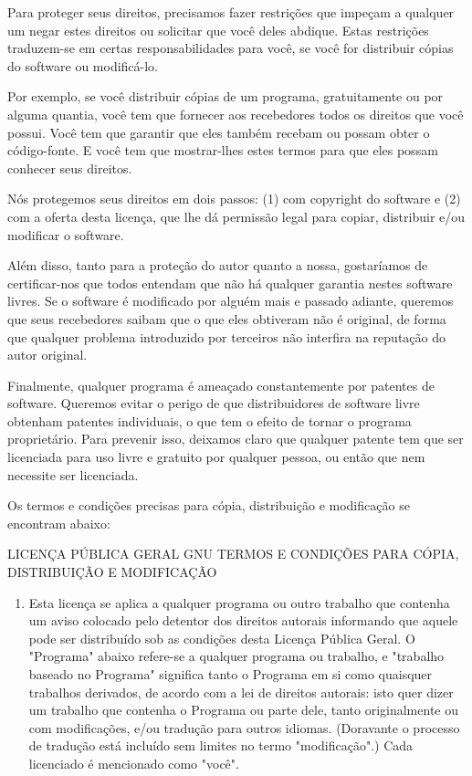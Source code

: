 {  Para proteger seus direitos, precisamos fazer restrições que impeçam
a qualquer um negar estes direitos ou solicitar que você deles
abdique. Estas restrições traduzem-se em certas responsabilidades para
você, se você for distribuir cópias do software ou modificá-lo.

  Por exemplo, se você distribuir cópias de um programa, gratuitamente
ou por alguma quantia, você tem que fornecer aos recebedores todos os
direitos que você possui. Você tem que garantir que eles também
recebam ou possam obter o código-fonte. E você tem que mostrar-lhes
estes termos para que eles possam conhecer seus direitos.

  Nós protegemos seus direitos em dois passos: (1) com copyright do
software e (2) com a oferta desta licença, que lhe dá permissão legal
para copiar, distribuir e/ou modificar o software.

  Além disso, tanto para a proteção do autor quanto a nossa,
gostaríamos de certificar-nos que todos entendam que não há qualquer
garantia nestes software livres. Se o software é modificado por alguém
mais e passado adiante, queremos que seus recebedores saibam que o que
eles obtiveram não é original, de forma que qualquer problema
introduzido por terceiros não interfira na reputação do autor
original.

  Finalmente, qualquer programa é ameaçado constantemente por patentes
de software. Queremos evitar o perigo de que distribuidores de
software livre obtenham patentes individuais, o que tem o efeito de
tornar o programa proprietário. Para prevenir isso, deixamos claro que
qualquer patente tem que ser licenciada para uso livre e gratuito por
qualquer pessoa, ou então que nem necessite ser licenciada.

  Os termos e condições precisas para cópia, distribuição e
modificação se encontram abaixo:

\begin{center}
		      LICENÇA PÚBLICA GERAL GNU
      TERMOS E CONDIÇÕES PARA CÓPIA, DISTRIBUIÇÃO E MODIFICAÇÃO
\end{center}

\begin{enumerate}
\item Esta licença se aplica a qualquer programa ou outro trabalho que
contenha um aviso colocado pelo detentor dos direitos autorais
informando que aquele pode ser distribuído sob as condições desta
Licença Pública Geral. O "Programa" abaixo refere-se a qualquer
programa ou trabalho, e "trabalho baseado no Programa" significa tanto
o Programa em si como quaisquer trabalhos derivados, de acordo com a
lei de direitos autorais: isto quer dizer um trabalho que contenha o
Programa ou parte dele, tanto originalmente ou com modificações, e/ou
tradução para outros idiomas. (Doravante o processo de tradução está
incluído sem limites no termo "modificação".) Cada licenciado é
mencionado como "você".


\end{enumerate}}

